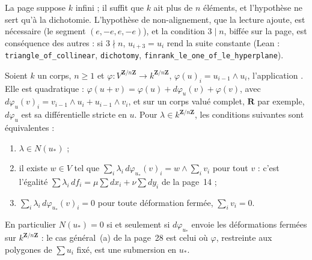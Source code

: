 \begin{remarque}
La page suppose $k$ infini ; il suffit que $k$ ait plus de $n$ éléments, et l'hypothèse ne sert qu'à la dichotomie. L'hypothèse de non-alignement, que la lecture ajoute, est nécessaire (le segment $(e, -e, e, -e)$), et la condition $3 \mid n$, biffée sur la page, est conséquence des autres : si $3 \nmid n$, $u_{i+3} = u_i$ rend la suite constante (Lean : \texttt{triangle\_of\_collinear}, \texttt{dichotomy}, \texttt{finrank\_le\_one\_of\_le\_hyperplane}).
\end{remarque}

\begin{encadre}
\begin{theoreme}\label{thm:73-lagrange}
Soient $k$ un corps, $n \geqslant 1$ et $\varphi : V^{\mathbf{Z}/n\mathbf{Z}} \to k^{\mathbf{Z}/n\mathbf{Z}}$, $\varphi(u)_i = u_{i-1} \wedge u_i$, l'application . Elle est quadratique : $\varphi(u + v) = \varphi(u) + d\varphi_u(v) + \varphi(v)$, avec $d\varphi_u(v)_i = v_{i-1} \wedge u_i + u_{i-1} \wedge v_i$, et sur un corps valué complet, $\mathbf{R}$ par exemple, $d\varphi_u$ est sa différentielle stricte en $u$. Pour $\lambda \in k^{\mathbf{Z}/n\mathbf{Z}}$, les conditions suivantes sont équivalentes :
\begin{enumerate}
\item $\lambda \in N(u_*)$ ;
\item il existe $w \in V$ tel que $\sum_i \lambda_i\, d\varphi_{u_*}(v)_i = w \wedge \sum_i v_i$ pour tout $v$ : c'est l'égalité $\sum \lambda_i\, df_i = \mu \sum dx_i + \nu \sum dy_i$ de la page~14 ;
\item $\sum_i \lambda_i\, d\varphi_{u_*}(v)_i = 0$ pour toute déformation fermée, $\sum_i v_i = 0$.
\end{enumerate}
En particulier $N(u_*) = 0$ si et seulement si $d\varphi_{u_*}$ envoie les déformations fermées sur $k^{\mathbf{Z}/n\mathbf{Z}}$ : le cas général~(a) de la page~28 est celui où $\varphi$, restreinte aux polygones de $\sum u_i$ fixé, est une submersion en $u_*$.
\end{theoreme}
\end{encadre}

